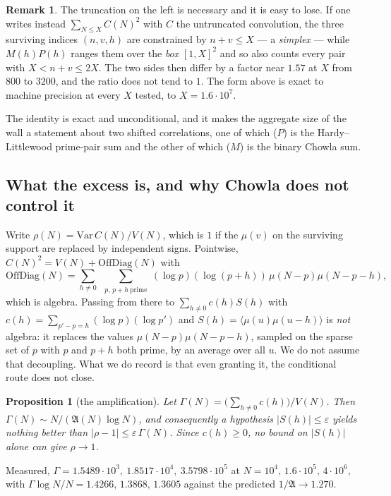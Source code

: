 \documentclass[11pt,a4paper]{article}
\theoremstyle{plain}
\newtheorem{proposition}[theorem]{Proposition}
\theoremstyle{definition}
\newtheorem{remark}[theorem]{Remark}
\newcommand{\AAA}{\mathfrak{A}}
\begin{document}
\begin{remark}
The truncation on the left is necessary and it is easy to lose. If one
writes instead $\sum_{N\le X}C(N)^2$ with $C$ the untruncated
convolution, the three surviving indices $(n,v,h)$ are constrained by
$n+v\le X$ --- a \emph{simplex} --- while $M(h)P(h)$ ranges them over
the \emph{box} $[1,X]^2$ and so also counts every pair with
$X< n+v\le 2X$. The two sides then differ by a factor near $1.57$ at
$X$ from $800$ to $3200$, and the ratio does not tend to $1$. The form
above is exact to machine precision at every $X$ tested, to
$X=1.6\cdot10^7$.
\end{remark}

The identity is exact and unconditional, and it makes the aggregate
size of the wall a statement about two shifted correlations, one of
which ($P$) is the Hardy--Littlewood prime-pair sum and the other of
which ($M$) is the binary Chowla sum.

\subsection{What the excess is, and why Chowla does not control it}

Write $\rho(N) = \mathrm{Var}\,C(N)/V(N)$, which is $1$ if the $\mu(v)$
on the surviving support are replaced by independent signs. Pointwise,
$C(N)^2 = V(N) + \mathrm{OffDiag}(N)$ with
\[
  \mathrm{OffDiag}(N)
  = \sum_{h\ne0}\ \sum_{\substack{p,\,p+h\ \mathrm{prime}}}
    (\log p)(\log(p+h))\,\mu(N-p)\mu(N-p-h),
\]
which is algebra. Passing from there to $\sum_{h\ne0}c(h)S(h)$ with
$c(h)=\sum_{p'-p=h}(\log p)(\log p')$ and
$S(h)=\langle\mu(u)\mu(u-h)\rangle$ is \emph{not} algebra: it replaces
the values $\mu(N-p)\mu(N-p-h)$, sampled on the sparse set of $p$ with
$p$ and $p+h$ both prime, by an average over all $u$. We do not assume
that decoupling. What we do record is that even granting it, the
conditional route does not close.

\begin{proposition}[the amplification]\label{prop:W}
Let $\Gamma(N) = \bigl(\sum_{h\ne0}c(h)\bigr)/V(N)$. Then
$\Gamma(N) \sim N/(\AAA(N)\log N)$, and consequently a hypothesis
$|S(h)|\le\varepsilon$ yields nothing better than
$|\rho-1| \le \varepsilon\,\Gamma(N)$. Since $c(h)\ge0$, no bound on
$|S(h)|$ alone can give $\rho\to1$.
\end{proposition}

Measured, $\Gamma = 1.5489\cdot10^{3},\ 1.8517\cdot10^{4},\
3.5798\cdot10^{5}$ at $N=10^4,\,1.6\cdot10^5,\,4\cdot10^6$, with
$\Gamma\log N/N = 1.4266,\,1.3868,\,1.3605$ against the predicted
$1/\AAA \to 1.270$.
\end{document}
